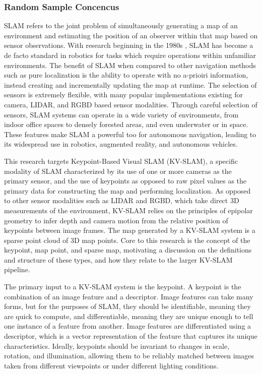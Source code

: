 \subsubsection{Random Sample Concencus}



SLAM refers to the joint problem of simultaneously generating a map of an environment and estimating the position of an observer within that map based on sensor observations. With research beginning in the 1980s \cite{smithEstimatingUncertainSpatial1988}, SLAM has become a de facto standard in robotics for tasks which require operations within unfamiliar environments. The benefit of SLAM when compared to other navigation methods such as pure localization is the ability to operate with no a-prioiri information, instead creating and incrementally updating the map at runtime. The selection of sensors is extremely flexible, with many popular implementations existing for camera, LIDAR, and RGBD based sensor modalities. Through careful selection of sensors, SLAM systems can operate in a wide variety of environments, from indoor office spaces to densely forested areas, and even underwater or in space.  These features make SLAM a powerful too for autonomous navigation, leading to its widespread use in robotics, augmented reality, and autonomous vehicles.

This research targets Keypoint-Based Visual SLAM (KV-SLAM), a specific modality of SLAM characterized by its use of one or more cameras as the primary sensor, and the use of keypoints as opposed to raw pixel values as the primary data for constructing the map and performing localization. As opposed to other sensor modalities such as LIDAR and RGBD, which take direct 3D measurements of the environment, KV-SLAM relies on the principles of epipolar geometry to infer depth and camera motion from the relative position of keypoints between image frames. The map generated by a KV-SLAM system is a sparse point cloud of 3D map points. Core to this research is the concept of the keypoint, map point, and sparse map, motivating a discussion on the definitions and structure of these types, and how they relate to the larger KV-SLAM pipeline.


The primary input to a KV-SLAM system is the keypoint. A keypoint is the combination of an image feature and a descriptor. Image features can take many forms, but for the purposes of SLAM, they should be identifiable, meaning they are quick to compute, and differentiable, meaning they are unique enough to tell one instance of a feature from another. Image features are differentiated using a descriptor, which is a vector representation of the feature that captures its unique characteristics. Ideally, keypoints should be invariant to changes in scale, rotation, and illumination, allowing them to be reliably matched between images taken from different viewpoints or under different lighting conditions.


